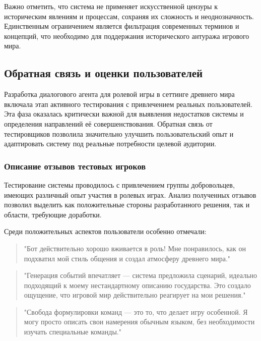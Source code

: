 Важно отметить, что система не применяет искусственной цензуры к историческим явлениям и процессам, сохраняя их сложность и неоднозначность. Единственным ограничением является фильтрация современных терминов и концепций, что необходимо для поддержания исторического антуража игрового мира.

\subsection{Обратная связь и оценки пользователей}

Разработка диалогового агента для ролевой игры в сеттинге древнего мира включала этап активного тестирования с привлечением реальных пользователей. Эта фаза оказалась критически важной для выявления недостатков системы и определения направлений её совершенствования. Обратная связь от тестировщиков позволила значительно улучшить пользовательский опыт и адаптировать систему под реальные потребности целевой аудитории.

\subsubsection{Описание отзывов тестовых игроков}

Тестирование системы проводилось с привлечением группы добровольцев, имеющих различный опыт участия в ролевых играх. Анализ полученных отзывов позволил выделить как положительные стороны разработанного решения, так и области, требующие доработки.

Среди положительных аспектов пользователи особенно отмечали:

\begin{quote}
"{}Бот действительно хорошо вживается в роль! Мне понравилось, как он подхватил мой стиль общения и создал атмосферу древнего мира."{}
\end{quote}

\begin{quote}
"{}Генерация событий впечатляет — система предложила сценарий, идеально подходящий к моему нестандартному описанию государства. Это создало ощущение, что игровой мир действительно реагирует на мои решения."{}
\end{quote}

\begin{quote}
"{}Свобода формулировки команд — это то, что делает игру особенной. Я могу просто описать свои намерения обычным языком, без необходимости изучать специальные команды."{}
\end{quote}

